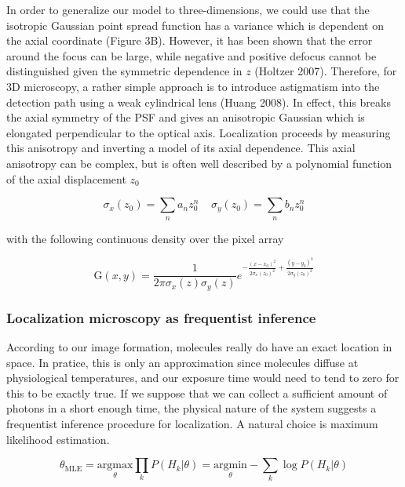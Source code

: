 \documentclass{ucetd}
\begin{document}
In order to generalize our model to three-dimensions, we could use that the isotropic Gaussian point spread function has a variance which is dependent on the axial coordinate (Figure 3B). However, it has been shown that the error around the focus can be large, while negative and positive defocus cannot be distinguished given the symmetric dependence in $z$ (Holtzer 2007). Therefore, for 3D microscopy, a rather simple approach is to introduce astigmatism into the detection path using a weak cylindrical lens (Huang 2008). In effect, this breaks the axial symmetry of the PSF and gives an anisotropic Gaussian which is elongated perpendicular to the optical axis. Localization proceeds by measuring this anisotropy and inverting a model of its axial dependence. This axial anisotropy can be complex, but is often well described by a polynomial function of the axial displacement $z_{0}$

\begin{equation*}
\sigma_{x}(z_{0}) = \sum_{n}a_{n}z_{0}^{n}\;\;\;\; \sigma_{y}(z_{0}) = \sum_{n}b_{n}z_{0}^{n}
\end{equation*}

with the following continuous density over the pixel array

\begin{equation}
\mathrm{G}(x,y) = \frac{1}{2\pi\sigma_{x}(z)\sigma_{y}(z)}e^{-\frac{(x-x_{0})^{2}}{2\sigma_{x}(z_{0})^{2}}+\frac{(y-y_{0})^{2}}{2\sigma_{y}(z_{0})^{2}}}
\end{equation}


\subsubsection{Localization microscopy as frequentist inference}

According to our image formation, molecules really do have an exact location in space. In pratice, this is only an approximation since molecules diffuse at physiological temperatures, and our exposure time would need to tend to zero for this to be exactly true. If we suppose that we can collect a sufficient amount of photons in a short enough time, the physical nature of the system suggests a frequentist inference procedure for localization. A natural choice is maximum likelihood estimation. 

\begin{equation*}
\theta_{\mathrm{MLE}} = \underset{\theta}{\mathrm{argmax}}\prod_{k}P(H_{k}|\theta)= \underset{\theta}{\mathrm{argmin}}-\sum_{k}\log P(H_{k}|\theta)
\end{equation*}
\end{document}
